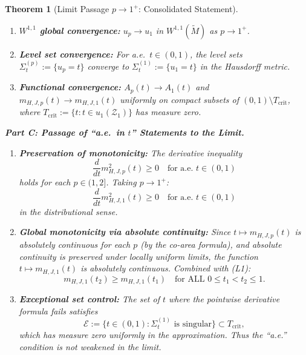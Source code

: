 \documentclass[12pt]{article}
\theoremstyle{plain}
\newtheorem{theorem}{Theorem}[section]
\theoremstyle{definition}
\theoremstyle{remark}
\newcommand{\tM}{\tilde{M}}
\begin{document}
\begin{theorem}[Limit Passage $p \to 1^+$: Consolidated Statement]
\begin{enumerate}
    \item[(C2)] \textbf{$W^{1,1}$ global convergence:} $u_p \to u_1$ in $W^{1,1}(\tM)$ as $p \to 1^+$.
    
    \item[(C3)] \textbf{Level set convergence:} For a.e.\ $t \in (0, 1)$, the level sets $\Sigma_t^{(p)} := \{u_p = t\}$ converge to $\Sigma_t^{(1)} := \{u_1 = t\}$ in the Hausdorff metric.
    
    \item[(C4)] \textbf{Functional convergence:} $A_p(t) \to A_1(t)$ and $m_{H,J,p}(t) \to m_{H,J,1}(t)$ uniformly on compact subsets of $(0, 1) \setminus T_{\mathrm{crit}}$, where $T_{\mathrm{crit}} := \{t : t \in u_1(\mathcal{Z}_1)\}$ has measure zero.
\end{enumerate}

\smallskip
\noindent\textbf{Part C: Passage of ``a.e.\ in $t$'' Statements to the Limit.}
\begin{enumerate}
    \item[(L1)] \textbf{Preservation of monotonicity:} The derivative inequality
    \[
    \frac{d}{dt}m_{H,J,p}^2(t) \geq 0 \quad \text{for a.e.\ } t \in (0, 1)
    \]
    holds for each $p \in (1, 2]$. Taking $p \to 1^+$:
    \[
    \frac{d}{dt}m_{H,J,1}^2(t) \geq 0 \quad \text{for a.e.\ } t \in (0, 1)
    \]
    in the distributional sense.
    
    \item[(L2)] \textbf{Global monotonicity via absolute continuity:} Since $t \mapsto m_{H,J,p}(t)$ is absolutely continuous for each $p$ (by the co-area formula), and absolute continuity is preserved under locally uniform limits, the function $t \mapsto m_{H,J,1}(t)$ is absolutely continuous. Combined with (L1):
    \[
    m_{H,J,1}(t_2) \geq m_{H,J,1}(t_1) \quad \text{for ALL } 0 \leq t_1 < t_2 \leq 1.
    \]
    
    \item[(L3)] \textbf{Exceptional set control:} The set of $t$ where the pointwise derivative formula fails satisfies
    \[
    \mathcal{E} := \{t \in (0,1) : \Sigma_t^{(1)} \text{ is singular}\} \subset T_{\mathrm{crit}},
    \]
    which has measure zero uniformly in the approximation. Thus the ``a.e.'' condition is not weakened in the limit.
\end{enumerate}
\end{theorem}
\end{document}
